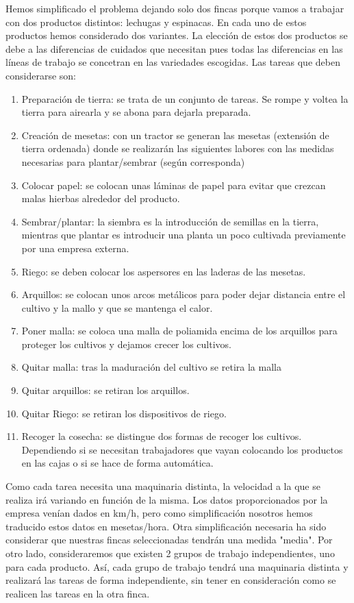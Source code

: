 Hemos simplificado el problema dejando solo dos fincas porque vamos a trabajar con dos productos distintos: lechugas y espinacas. 
En cada uno de estos productos hemos considerado dos variantes. 
La elección de estos dos productos se debe a las diferencias de cuidados que necesitan pues todas las diferencias en las líneas de 
trabajo se concetran en las variedades escogidas. 
Las tareas que deben considerarse son: 
\begin {enumerate}
    \item Preparación de tierra: se trata de un conjunto de tareas. Se rompe y voltea la tierra para airearla y se abona para dejarla 
    preparada.
    \item Creación de mesetas: con un tractor se generan las mesetas (extensión de tierra ordenada) donde se realizarán las siguientes
    labores con las medidas necesarias para plantar/sembrar (según corresponda)
    \item Colocar papel: se colocan unas láminas de papel para evitar que crezcan malas hierbas alrededor del producto. 
    \item Sembrar/plantar: la siembra es la introducción de semillas en la tierra, mientras que plantar es introducir una planta 
    un poco cultivada previamente por una empresa externa. 
    \item Riego: se deben colocar los aspersores en las laderas de las mesetas. 
    \item Arquillos: se colocan unos arcos metálicos para poder dejar distancia entre el cultivo y la mallo y que se mantenga el 
    calor.
    \item Poner malla: se coloca una malla de poliamida encima de los arquillos para proteger los cultivos y dejamos crecer los cultivos. 
    \item Quitar malla: tras la maduración del cultivo se retira la malla
    \item Quitar arquillos: se retiran los arquillos.
    \item Quitar Riego: se retiran los dispositivos de riego.
    \item Recoger la cosecha: se distingue dos formas de recoger los cultivos. Dependiendo si se necesitan trabajadores que vayan 
    colocando los productos en las cajas o si se hace de forma automática.
    
\end{enumerate}

Como cada tarea necesita una maquinaria distinta, la velocidad a la que se realiza irá variando en función de la misma. 
Los datos proporcionados por la empresa venían dados en km/h, pero como simplificación nosotros hemos traducido estos datos en mesetas/hora.
Otra simplificación necesaria ha sido considerar que nuestras fincas seleccionadas tendrán una medida "media". 
Por otro lado, consideraremos que existen 2 grupos de trabajo independientes, uno para cada producto. 
Así, cada grupo de trabajo tendrá una maquinaria distinta y realizará las tareas de forma independiente, sin tener en consideración como se realicen las tareas en la otra finca.


